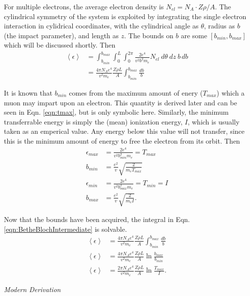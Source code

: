 For multiple electrons, the average electron density is $N_{el}=N_A\cdot Z\rho/A$. The cylindrical symmetry of the system is exploited by integrating the single electron interaction in cylidrical coordinates, with the cylindrical angle as $\theta$, radius as $b$ (the impact parameter), and length as $z$. The bounds on $b$ are some $[b_{min},b_{max}]$ which will be discussed shortly. Then
\begin{align}
\left<\epsilon\right>&=\int_{b_{min}} ^{b_{max}} \int_0 ^L \int_0 ^{2\pi}  \frac{2e^4}{v^2b^2m_e}N_{el}\: d\theta \: dz\: b \,db \nonumber\\
&=\frac{4\pi N_A e^4}{v^2 m_e}\frac{Z\rho L}{A}\int_{b_{min}} ^{b_{max}} \frac{db}{b} \label{eqn:BetheBlochIntermediate}
\end{align}

It is known that $b_{min}$ comes from the maximum amount of enery ($T_{max}$) which a muon may impart upon an electron. This quantity is derived later and can be seen in Eqn. \ref{eqn:tmax}, but is only symbolic here. Similarly, the minimum transferrable energy is simply the (mean) ionization energy, $I$, which is usually taken as an emperical value. Any energy below this value will not transfer, since this is the minimum amount of energy to free the electron from its orbit. Then
\begin{align*}
\epsilon_{max}&=\frac{2e^4}{v^2b_{min} ^2 m_e}=T_{max}\\
b_{min}&=\frac{e^2}{v}\sqrt{\frac{2}{m_e T_{max}}}\\[12pt]
\epsilon_{min}&=\frac{2e^4}{v^2b_{max} ^2 m_e}=T_{min}=I\\
b_{max}&=\frac{e^2}{v}\sqrt{\frac{2}{m_e I}}.
\end{align*}

Now that the bounds have been acquired, the integral in Eqn. \ref{eqn:BetheBlochIntermediate} is solvable.
\begin{align}
\left<\epsilon\right> &= \frac{4\pi N_A e^4}{v^2 m_e} \frac{Z\rho L}{A}\int_{b_{min}} ^{b_{max}} \frac{db}{b}\nonumber\\
\left<\epsilon\right> &= \frac{4\pi N_A e^4}{v^2 m_e} \frac{Z\rho L}{A} \ln{\frac{b_{max}}{b_{min}}}\nonumber\\
\left<\epsilon\right> &= \frac{2\pi N_A e^4}{v^2 m_e} \frac{Z\rho L}{A} \ln{\frac{T_{max}}{I}} \label{eqn:BetheBlochClassical}.
\end{align}

\vspace{24pt}
\noindent \textit{\large{Modern Derivation}}
\vspace{12pt}

